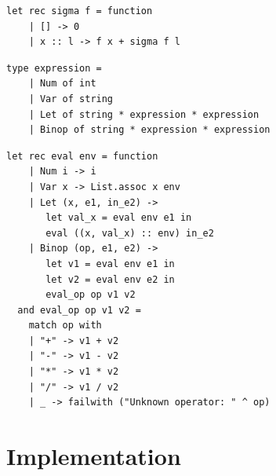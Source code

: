 \documentclass[12pt,twoside,notitlepage]{report}
\begin{document}
\begin{minipage}{\linewidth}
\begin{lstlisting}[caption={OCaml higher order functions example}]
let rec sigma f = function
    | [] -> 0
    | x :: l -> f x + sigma f l
\end{lstlisting}
\end{minipage}
    
\begin{minipage}{\linewidth}
\begin{lstlisting}[caption={OCaml data structure example}]
type expression =
    | Num of int
    | Var of string
    | Let of string * expression * expression
    | Binop of string * expression * expression
\end{lstlisting}
\end{minipage}
    
\begin{minipage}{\linewidth}
\begin{lstlisting}[caption={OCaml evaluation function example}]    
let rec eval env = function
    | Num i -> i
    | Var x -> List.assoc x env
    | Let (x, e1, in_e2) ->
       let val_x = eval env e1 in
       eval ((x, val_x) :: env) in_e2
    | Binop (op, e1, e2) ->
       let v1 = eval env e1 in
       let v2 = eval env e2 in
       eval_op op v1 v2
  and eval_op op v1 v2 =
    match op with
    | "+" -> v1 + v2
    | "-" -> v1 - v2
    | "*" -> v1 * v2
    | "/" -> v1 / v2
    | _ -> failwith ("Unknown operator: " ^ op)
\end{lstlisting}
\end{minipage}



\cleardoublepage
\chapter{Implementation}
\end{document}
